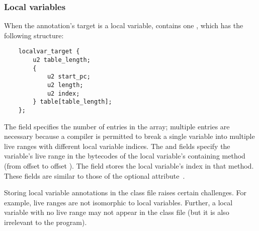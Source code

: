\documentclass[10pt]{article}
\begin{document}


\subsubsection{Local variables\label{class-file:ext:ri:localvar}}

When the annotation's target is a local variable,
 contains one , which has the
following structure:

\begin{Verbatim}
    localvar_target {
        u2 table_length;
        {
            u2 start_pc;
            u2 length;
            u2 index;
        } table[table_length];
    };
\end{Verbatim}

The  field specifies the number of entries in the
 array; multiple entries are necessary because a compiler is
permitted to break a single variable into multiple live ranges with different
local variable indices.
The  and  fields specify the variable's
live range in the bytecodes of the local variable's containing method
(from offset  to offset ).  The
 field stores the local variable's index in that method.
These fields are similar to those of the optional
 attribute~\cite[\S 4.8.12]{LindholmY99:CFF5}.

Storing local variable annotations in the class file raises certain
challenges.  For example, live ranges are not isomorphic to local
variables.  Further, a local variable with no live range may not appear in
the class file (but it is also irrelevant to the program).
\end{document}
